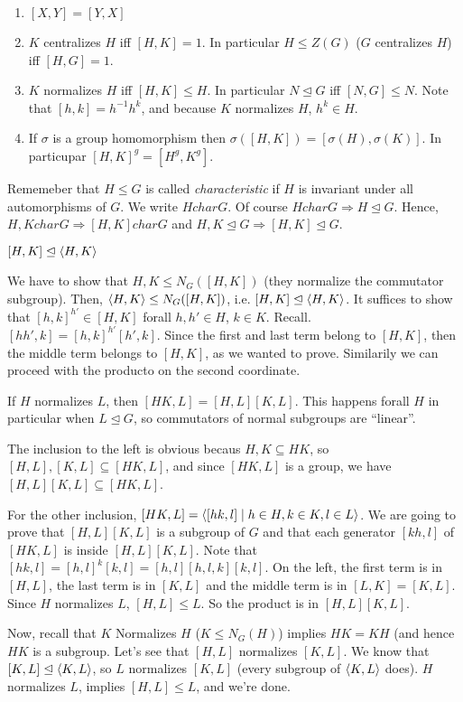 \documentclass[twoside, 11pt]{article}
\begin{document}
\begin{enumerate}
\item $[X,Y]=[Y,X]$
\item $K$ centralizes $H$ iff $[H,K]=1$. In particular $H\leq Z(G)$ ($G$ centralizes $H$) iff $[H,G]=1$. 
\item $K$ normalizes $H$ iff $[H,K]\leq H$. In particular $N\trianglelefteq G$ iff $[N,G]\leq N$. Note that $[h,k]=h^{-1}h^k$, and because $K$ normalizes $H$, $h^k\in H$. 
\item If $\sigma$ is a group homomorphism then $\sigma([H,K])=[\sigma(H),\sigma(K)]$. In particupar $[H,K]^g=[H^g, K^g]$. 
\end{enumerate}
Rememeber that $H\leq G$ is called \emph{characteristic} if $H$ is invariant under all automorphisms of $G$. We write $H char G$. Of course $HcharG\Rightarrow H\trianglelefteq G$. Hence, $H,K char G\Rightarrow [H,K] char G$ and $H,K \trianglelefteq G\Rightarrow [H,K] \trianglelefteq G$. 

\begin{teorema}
$[H,K]\trianglelefteq\langle{H,K}\rangle$
\end{teorema}
\begin{dem}
We have to show that $H,K\leq N_G([H,K])$ (they normalize the commutator subgroup). Then, $\langle{H,K}\rangle\leq N_G([H,K])$, i.e. $[H,K]\trianglelefteq \langle{H,K}\rangle$. It suffices to show that $[h,k]^{h'}\in[H,K]$ forall $h,h'\in H$, $k\in K$. Recall. $[hh',k]=[h,k]^{h'}[h',k]$. Since the first and last term belong to $[H,K]$, then the middle term belongs to $[H,K]$, as we wanted to prove. Similarily we can proceed with the producto on the second coordinate. 
\end{dem}

\begin{teorema}
If $H$ normalizes $L$, then $[HK,L]=[H,L][K,L]$. This happens forall $H$ in particular when $L \trianglelefteq G$, so commutators of normal subgroups are ``linear''. 
\end{teorema}
\begin{dem}
The inclusion to the left is obvious becaus $H,K\subseteq HK$, so $[H,L],[K,L]\subseteq [HK,L]$, and since $[HK,L]$ is a group, we have $[H,L][K,L]\subseteq [HK,L]$. 

For the other inclusion, $[HK,L]=\langle{[hk,l]\mid h\in H,k\in K, l\in L}\rangle$. We are going to prove that $[H,L][K,L]$ is a subgroup of $G$ and that each generator $[kh,l]$ of $[HK,L]$ is inside $[H,L][K,L]$. Note that $[hk,l]=[h,l]^k[k,l]=[h,l][h,l,k][k,l]$. On the left, the first term is in $[H,L]$, the last term is in $[K,L]$ and the middle term is in $[L,K]=[K,L]$. Since $H$ normalizes $L$, $[H,L]\leq L$. So the product is in $[H,L][K,L]$. 

Now, recall that $K$ Normalizes $H$ ($K\leq N_G(H)$) implies $HK=KH$ (and hence $HK$ is a subgroup. Let's see that $[H,L]$ normalizes $[K,L]$. We know that $[K,L]\trianglelefteq \langle{K,L}\rangle$, so $L$ normalizes $[K,L]$ (every subgroup  of $\langle{K,L}\rangle$ does). $H$ normalizes $L$, implies $[H,L]\leq L$, and we're done. 
\end{dem}
\end{document}
